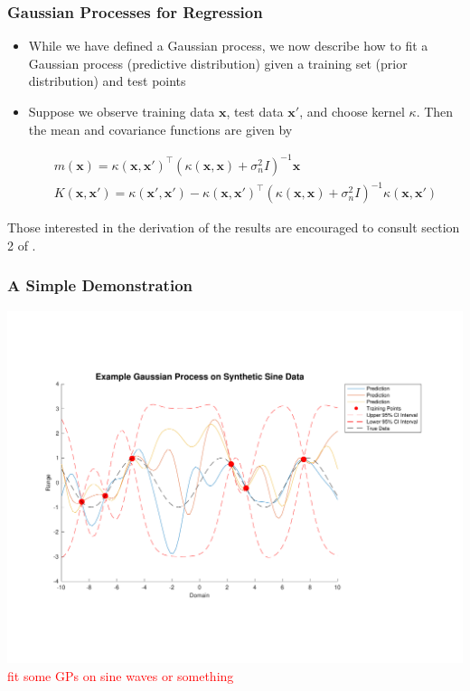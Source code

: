 \documentclass[pdf]{beamer}
\newcommand{\bx}{\boldsymbol{x}}
\newcommand{\todo}[1]{\textcolor{red}{#1}}
\begin{document}
\begin{frame}
  \frametitle{Gaussian Processes for Regression}

  \begin{itemize}
    \item While we have defined a Gaussian process, we now describe how to fit a Gaussian process (predictive
      distribution) given a training set (prior distribution) and test points
    \item Suppose we observe training data $\bx$, test data $\bx'$, and choose kernel $\kappa$. Then the mean and
      covariance functions are given by 

      \begin{gather*}
        m(\boldsymbol{x})=\kappa(\bx, \bx')^\top \left(\kappa(\bx, \bx) + \sigma_{n}^{2} I\right)^{-1}\bx \\
        K(\boldsymbol{x},\boldsymbol{x'}) = \kappa(\bx', \bx') - \kappa(\bx, \bx')^{\top}\left(\kappa(\bx, \bx) +
        \sigma_{n}^{2}I\right)^{-1}\kappa(\bx, \bx')
      \end{gather*}
  \end{itemize}

  Those interested in the derivation of the results are encouraged to consult section 2 of \cite{rasmussen_gaussian_2006}.
\end{frame}

\begin{frame}
  \frametitle{A Simple Demonstration}
  \vspace*{-1cm}
  \hspace*{-2cm} \includegraphics[scale=0.5]{synthetic_data}
  \todo{fit some GPs on sine waves or something}
\end{frame}
\end{document}
